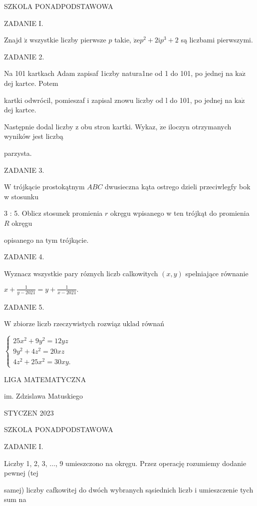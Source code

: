 \documentclass[a4paper,12pt]{article}
\begin{document}
SZKOLA PONADPODSTAWOWA

ZADANIE I.

Znajd $\acute{\mathrm{z}}$ wszystkie liczby pierwsze $p$ takie, $\dot{\mathrm{z}}\mathrm{e}p^{2}+2\mathrm{i}p^{3}+2$ są liczbami pierwszymi.

ZADANIE 2.

Na 101 kartkach Adam zapisaf 1iczby natura1ne od 1 do 101, po jednej na $\mathrm{k}\mathrm{a}\dot{\mathrm{z}}$ dej kartce. Potem

kartki odwrócil, pomieszaf i zapisal znowu liczby od l do 101, po jednej na $\mathrm{k}\mathrm{a}\dot{\mathrm{z}}$ dej kartce.

Następnie dodal liczby z obu stron kartki. Wykaz, $\dot{\mathrm{z}}\mathrm{e}$ iloczyn otrzymanych wyników jest liczbą

parzysta.

ZADANIE 3.

$\mathrm{W}$ trójkącie prostokątnym $ABC$ dwusieczna kąta ostrego dzieli przeciwlegfy bok w stosunku

3 : 5. Oblicz stosunek promienia $r$ okręgu wpisanego w ten trójkąt do promienia $R$ okręgu

opisanego na tym trójkącie.

ZADANIE 4.

Wyznacz wszystkie pary róznych liczb calkowitych $(x,y)$ spelniające równanie

$x+\displaystyle \frac{1}{y-2021}=y+\frac{1}{x-2021}.$

ZADANIE 5.

$\mathrm{W}$ zbiorze liczb rzeczywistych rozwiąz uklad równań

$\left\{\begin{array}{l}
25x^{2}+9y^{2}=12yz\\
9y^{2}+4z^{2}=20xz\\
4z^{2}+25x^{2}=30xy.
\end{array}\right.$






LIGA MATEMATYCZNA

im. Zdzislawa Matuskiego

STYCZEN 2023

SZKOLA PONADPODSTAWOWA

ZADANIE I.

Liczby 1, 2, 3, $\ldots$, 9 umieszczono na okręgu. Przez operację rozumiemy dodanie pewnej (tej

samej) liczby cafkowitej do dwóch wybranych sąsiednich liczb i umieszczenie tych sum na
\end{document}
